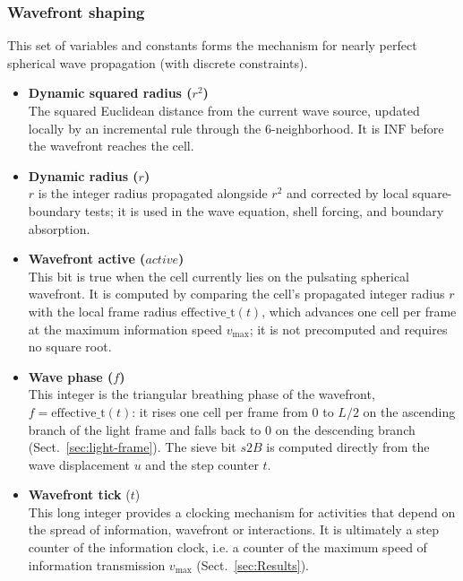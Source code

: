 \documentclass{ijuc}
\begin{document}
\subsubsection{Wavefront shaping}
This set of variables and constants forms the mechanism for nearly perfect spherical wave propagation (with discrete constraints).
\begin{itemize}
    \item \textbf{Dynamic squared radius ($r^{2}$)} \\
    The squared Euclidean distance from the current wave source, updated locally by an incremental rule through the 6-neighborhood. It is $\mathrm{INF}$ before the wavefront reaches the cell.

    \item \textbf{Dynamic radius ($r$)} \\
    $r$ is the integer radius propagated alongside $r^{2}$ and corrected by local square-boundary tests; it is used in the wave equation, shell forcing, and boundary absorption.

    \item \textbf{Wavefront active ($\mathit{active}$)} \\
    This bit is true when the cell currently lies on the pulsating spherical wavefront. It is computed by comparing the cell's propagated integer radius $r$ with the local frame radius $\mathrm{effective\_t}(t)$, which advances one cell per frame at the maximum information speed $v_{\max}$; it is not precomputed and requires no square root.

    \item \textbf{Wave phase ($f$)} \\
    This integer is the triangular breathing phase of the wavefront, $f=\mathrm{effective\_t}(t)$: it rises one cell per frame from $0$ to $L/2$ on the ascending branch of the light frame and falls back to $0$ on the descending branch (Sect.~\ref{sec:light-frame}). The sieve bit $s2B$ is computed directly from the wave displacement $u$ and the step counter $t$.

    \item \textbf{Wavefront tick} ($t$)\\
     This long integer provides a clocking mechanism for activities that depend on the spread of information, wavefront or interactions. It is ultimately a step counter of the information clock, i.e. a counter of the maximum speed of information transmission $v_{\max}$ (Sect.~\ref{sec:Results}).
 \end{itemize}
\end{document}
